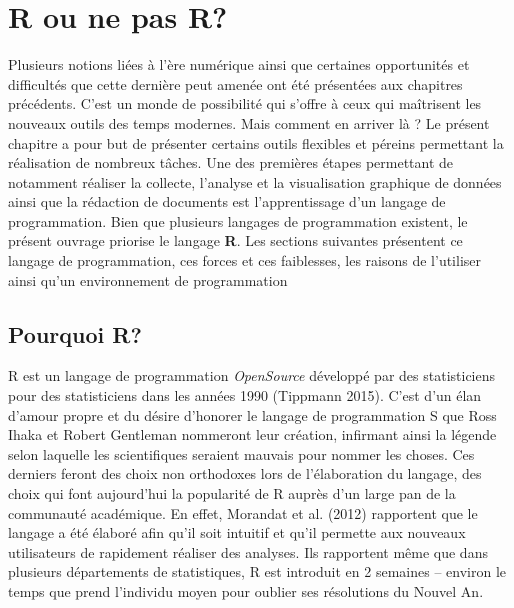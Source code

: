 \documentclass[
  letterpaper,
]{scrbook}
\begin{document}

\hypertarget{r-ou-ne-pas-r}{%
\chapter{R ou ne pas R?}\label{r-ou-ne-pas-r}}

Plusieurs notions liées à l'ère numérique ainsi que certaines
opportunités et difficultés que cette dernière peut amenée ont été
présentées aux chapitres précédents. C'est un monde de possibilité qui
s'offre à ceux qui maîtrisent les nouveaux outils des temps modernes.
Mais comment en arriver là ? Le présent chapitre a pour but de présenter
certains outils flexibles et péreins permettant la réalisation de
nombreux tâches. Une des premières étapes permettant de notamment
réaliser la collecte, l'analyse et la visualisation graphique de données
ainsi que la rédaction de documents est l'apprentissage d'un langage de
programmation. Bien que plusieurs langages de programmation existent, le
présent ouvrage priorise le langage \textbf{R}. Les sections suivantes
présentent ce langage de programmation, ces forces et ces faiblesses,
les raisons de l'utiliser ainsi qu'un environnement de programmation

\hypertarget{pourquoi-r}{%
\section{Pourquoi R?}\label{pourquoi-r}}

R est un langage de programmation \emph{OpenSource} développé par des
statisticiens pour des statisticiens dans les années 1990 (Tippmann
2015). C'est d'un élan d'amour propre et du désire d'honorer le langage
de programmation S que Ross Ihaka et Robert Gentleman nommeront leur
création, infirmant ainsi la légende selon laquelle les scientifiques
seraient mauvais pour nommer les choses. Ces derniers feront des choix
non orthodoxes lors de l'élaboration du langage, des choix qui font
aujourd'hui la popularité de R auprès d'un large pan de la communauté
académique. En effet, Morandat et al. (2012) rapportent que le langage a
été élaboré afin qu'il soit intuitif et qu'il permette aux nouveaux
utilisateurs de rapidement réaliser des analyses. Ils rapportent même
que dans plusieurs départements de statistiques, R est introduit en 2
semaines -- environ le temps que prend l'individu moyen pour oublier ses
résolutions du Nouvel An.
\end{document}
